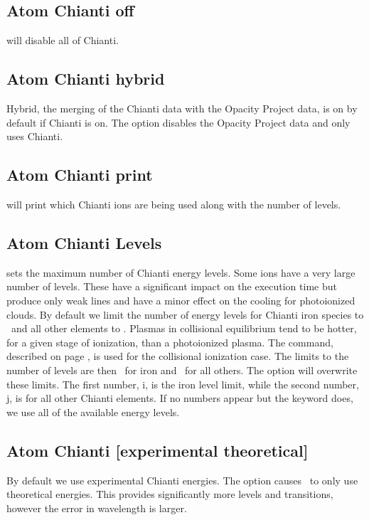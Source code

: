 \subsection{Atom Chianti off} 
will disable all of Chianti.

\subsection{Atom Chianti hybrid} 
Hybrid, the merging of the Chianti data with the Opacity Project data, 
is on by default if Chianti is on.
The  option disables the Opacity Project data and only uses Chianti.

\subsection{Atom Chianti print} 
will print which Chianti ions are being used
along with the number of levels.
 
\subsection{Atom Chianti Levels} 
sets the maximum number of Chianti energy levels. 
Some ions have a very large number of levels.
These have a significant impact
on the execution time but produce only weak lines and have a minor effect
on the cooling for photoionized clouds.
By default we limit the number of energy levels for Chianti iron species to 
\nChiantiPhotoLevelsFe\ and all other elements to \nChiantiPhotoLevels.
Plasmas in collisional equilibrium tend to be hotter, for a given
stage of ionization, than a photoionized plasma.  
The  command, described on
page \pageref{sec:CommandCoronalEquilibrium}, is used for
the collisional ionization case.
The limits to the number of levels are then \nChiantiCollLevelsFe\ for iron 
and \nChiantiCollLevels\ for all others.
The  option will overwrite these limits.
The first number, i, is the iron level limit, while the second number, 
j, is for all other Chianti elements.
If no numbers appear but the keyword  does, we use all 
of the available energy levels.

\subsection{Atom Chianti [experimental theoretical]}
By default we use experimental Chianti energies.
The  option causes \Cloudy\ to only use theoretical 
energies.
This provides significantly more levels and transitions, 
however the error in wavelength is larger.

